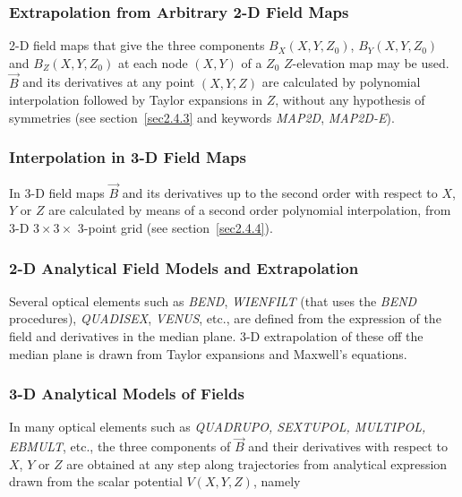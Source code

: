 \subsubsection{Extrapolation from Arbitrary 2-D Field Maps}\label{sec2.3.3}

2-D field maps that give the three components $ B_X(X,Y,Z_0)$,  
$B_Y(X,Y,Z_0) $ and $ B_Z(X,Y,Z_0) $ 
at each node $ (X,Y) $ of a $ Z_0 $ $ Z$-elevation map may be used. 
$ \vec  B$ and its derivatives at any point $ (X,Y,Z) $ are calculated by polynomial 
interpolation  followed by Taylor expansions in $ Z$,
without any hypothesis of symmetries (see section~\ref{sec2.4.3} and keywords 
\textsl{MAP2D}, \textsl{MAP2D-E}).

\subsubsection[Interpolation in 3-D Field Maps]%
        {Interpolation in 3-D Field Maps~\protect\cite{Biblio4}}
           \label{sec2.3.4} %

In 3-D field maps $ \vec  B $ and its derivatives up to the second
order with respect to $ X$, $Y$  or $ Z $ are calculated by means of a second order polynomial 
interpolation,  from  3-D  $ 3  \times  3 
 \times $ 3-point grid (see section~\ref{sec2.4.4}). 




\subsubsection{2-D Analytical Field Models and Extrapolation \label{sec2DAnModels}} 

Several optical elements such as \textsl{BEND}, \textsl{WIENFILT} (that 
uses the \textsl{BEND} procedures), \textsl{QUADISEX}, \textsl{VENUS}, etc., 
are defined from the  expression of the field and derivatives in the median plane. 
3-D extrapolation of these off the median plane is drawn from Taylor expansions and Maxwell's equations. 





 
\subsubsection{3-D Analytical Models of Fields} \label{sec2.3.5} 

In many optical elements such as \textsl{QUADRUPO, SEXTUPOL, 
MULTIPOL, EBMULT},  etc.,  the three 
components of $ \vec  B$  and their derivatives with respect to $ X$, $Y $ 
or $ Z $  are obtained at any step along trajectories from analytical 
expression drawn from the scalar potential $ V(X,Y,Z) $, namely  

